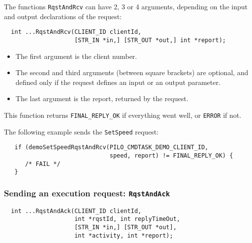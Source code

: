 The functions {\tt RqstAndRcv} can have 2, 3 or 4 arguments, depending on
the input and output declarations of the request:

\begin{center}\begin{cartouche}\small\begin{verbatim}
  int ...RqstAndRcv(CLIENT_ID clientId,
                    [STR_IN *in,] [STR_OUT *out,] int *report);
\end{verbatim}\end{cartouche}\end{center}

\begin{itemize}
\item The first argument is the client number. 

\item The second and third arguments (between square brackets) are
optional, and defined only if the request defines an input or an output
parameter.

\item The last argument is the report, returned by the request.
\end{itemize}

This function returns {\tt FINAL\_REPLY\_OK}  if everything went well, or
{\tt ERROR} if not.

\bigbreak

The following example sends the {\tt SetSpeed} request:

\begin{center}\begin{cartouche}\small\begin{verbatim}
   if (demoSetSpeedRqstAndRcv(PILO_CMDTASK_DEMO_CLIENT_ID, 
                              speed, report) != FINAL_REPLY_OK) {
      /* FAIL */
   }
\end{verbatim}\end{cartouche}\end{center}


\subsubsection{Sending an execution request: {\tt RqstAndAck}}

\begin{center}\begin{cartouche}\small\begin{verbatim}
  int ...RqstAndAck(CLIENT_ID clientId,
                    int *rqstId, int replyTimeOut,
                    [STR_IN *in,] [STR_OUT *out],
                    int *activity, int *report);
\end{verbatim}\end{cartouche}\end{center}

